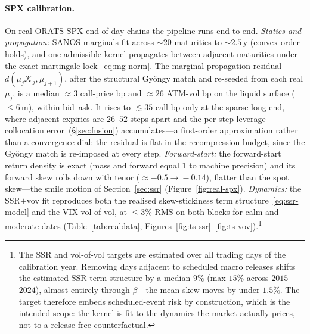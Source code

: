 \documentclass[11pt]{article}
\newcommand{\cK}{\mathcal{K}}
\begin{document}
\paragraph{SPX calibration.} On real ORATS SPX end-of-day chains the pipeline runs end-to-end.
\emph{Statics and propagation:} SANOS marginals fit across ${\sim}20$ maturities to ${\sim}2.5$\,y (convex
order holds), and one admissible kernel propagates between adjacent maturities under the exact martingale
lock~\eqref{eq:mg-norm}. The marginal-propagation residual $d(\mu_j\cK_j,\mu_{j+1})$, after the structural
Gy\"ongy match and re-seeded from each real $\mu_j$, is a median $\approx 3$ call-price bp and $\approx 26$
ATM-vol bp on the liquid surface ($\le 6$\,m), within bid--ask. It rises to $\lesssim 35$ call-bp only at the
sparse long end, where adjacent expiries are $26$--$52$ steps apart and the per-step leverage-collocation
error~(\S\ref{sec:fusion}) accumulates---a first-order approximation rather than a convergence dial: the
residual is flat in the recompression budget, since the Gy\"ongy match is re-imposed at every step.
\emph{Forward-start:} the forward-start return density is exact (mass and forward equal $1$ to machine
precision) and its forward skew rolls down with tenor ($\approx -0.5\!\to\!-0.14$), flatter than the spot
skew---the smile motion of Section~\ref{sec:ssr} (Figure~\ref{fig:real-spx}). \emph{Dynamics:} the SSR$+$vov
fit reproduces both the realised skew-stickiness term structure~\eqref{eq:ssr-model} and the VIX vol-of-vol,
at ${\le}3\%$ RMS on both blocks for calm and moderate dates (Table~\ref{tab:realdata},
Figures~\ref{fig:ts-ssr}--\ref{fig:ts-vov}).\footnote{The SSR and vol-of-vol targets are estimated over all
trading days of the calibration year. Removing days adjacent to scheduled macro releases shifts the
estimated SSR term structure by a median $9\%$ (max $15\%$ across $2015$--$2024$), almost entirely through
$\beta$---the mean skew moves by under $1.5\%$. The target therefore embeds scheduled-event risk by
construction, which is the intended scope: the kernel is fit to the dynamics the market actually prices,
not to a release-free counterfactual.}
\end{document}

